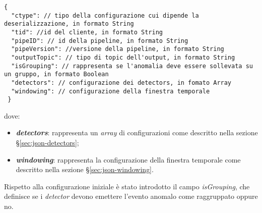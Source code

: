 \begin{verbatim}
{
  "ctype": // tipo della configurazione cui dipende la deserializzazione, in formato String
  "tid": //id del cliente, in formato String
  "pipeID": // id della pipeline, in formato String
  "pipeVersion": //versione della pipeline, in formato String
  "outputTopic": // tipo di topic dell'output, in formato String
  "isGrouping": // rappresenta se l'anomalia deve essere sollevata su un gruppo, in formato Boolean
  "detectors": // configurazione dei detectors, in fomato Array
  "windowing": // configurazione della finestra temporale
 }
\end{verbatim}
dove:
\begin{itemize}
	\item{\textbf{\textit{detectors}}: rappresenta un \textit{array} di configurazioni come descritto nella sezione \S\ref{sec:json-detectors}};
	\item{\textbf{\textit{windowing}}: rappresenta la configurazione della finestra temporale come descritto nella sezione \S\ref{sec:json-windowing}.}
\end{itemize}

Rispetto alla configurazione iniziale è stato introdotto il campo \textit{isGrouping}, che definisce se i \textit{detector} devono emettere l'evento anomalo come raggruppato oppure no.

